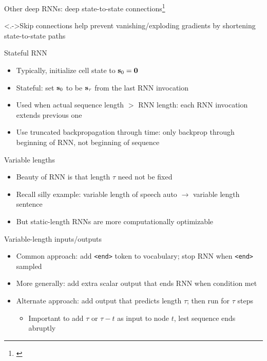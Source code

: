 \setcounter{footnote}{0}

\begin{frame}{Other deep RNNs: deep state-to-state connections\footnote{\citet{PascanuICLR14}}}
    

    \vspace{-1em}
    \uncover<.->{Skip connections help prevent vanishing/exploding gradients by shortening state-to-state paths
}
\end{frame}

\begin{frame}{Stateful RNN}
    \begin{itemize}[<.->]
        \item<+-> Typically, initialize cell state to $\mathbf{s}_0 = \mathbf{0}$
        \item<+-> Stateful: set $\mathbf{s}_0$ to be $\mathbf{s}_\tau$ from the last RNN invocation
        \item Used when actual sequence length $>$ RNN length: each RNN invocation extends previous one
        \item Use truncated backpropagation through time: only backprop through beginning of RNN, not beginning of sequence
    \end{itemize}

    \centering
    
\end{frame}

\begin{frame}{Variable lengths}
    \begin{itemize}
        \item Beauty of RNN is that length $\tau$ need not be fixed
        \item Recall silly example: variable length of speech auto $\to$ variable length sentence
        \item But static-length RNNs are more computationally optimizable
    \end{itemize}
    \pause

    Variable-length inputs/outputs
    \begin{itemize}
        \item Common approach: add \texttt{<end>} token to vocabulary; stop RNN when \texttt{<end>} sampled
        \item More generally: add extra scalar output that ends RNN when condition met
        \item Alternate approach: add output that predicts length $\tau$; then run for $\tau$ steps
        \begin{itemize}
            \item Important to add $\tau$ or $\tau - t$ as input to node $t$, lest sequence ends abruptly
        \end{itemize}
    \end{itemize}
\end{frame}

